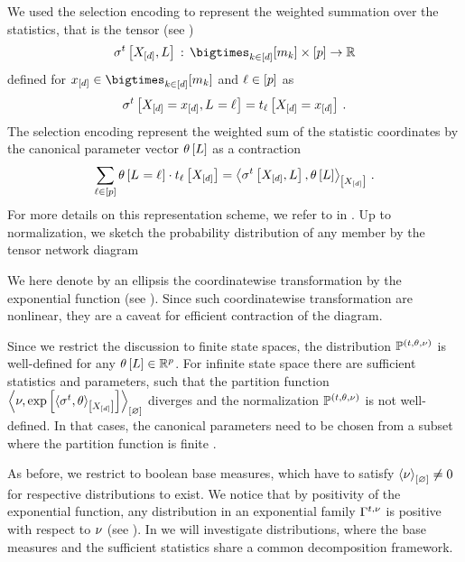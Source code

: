 

We used the selection encoding to represent the weighted summation over the statistics, that is the tensor (see )
\begin{align*}
    \sencsstatat{\shortcatvariables,\selvariable} \defcols \facstates \times [\seldim] \rightarrow \rr
\end{align*}
defined for $\shortcatindices\in\facstates$ and $\ell\in[p]$ as
\begin{align*}
    \sigma^{t}\left[X_{[d]}=x_{[d]},L_{}=\ell_{}\right] = t_{\ell}\left[X_{[d]}=x_{[d]}\right] \, .
\end{align*}
The selection encoding represent the weighted sum of the statistic coordinates by the canonical parameter vector $\theta\left[L\right]$ as a contraction
\begin{align*}
    \sum_{\ell\in[p]}\theta\left[L_{}=\ell_{}\right]\cdot t_{\ell}\left[X_{[d]}\right]
    = \left\langle \sigma^{t}\left[X_{[d]},L\right],\theta\left[L\right]\right\rangle_{\left[ X_{[d]} \right]} \, .
\end{align*}
For more details on this representation scheme, we refer to  in .
Up to normalization, we sketch the probability distribution of any member by the tensor network diagram
\begin{center}
     
\end{center}
We here denote by an ellipsis the coordinatewise transformation by the exponential function (see ).
Since such coordinatewise transformation are nonlinear, they are a caveat for efficient contraction of the diagram.

Since we restrict the discussion to finite state spaces, the distribution $\mathbb{P}^{(t,\theta,\nu)}$ is well-defined for any $\theta\left[L\right]\in\mathbb{R}^{p}$.
For infinite state space there are sufficient statistics and parameters, such that the partition function $\left\langle \nu,\mathrm{exp}\left[\left\langle \sigma^{t},\theta\right\rangle_{\left[ X_{[d]} \right]}\right]\right\rangle_{\left[ \varnothing \right]}$ diverges and the normalization $\mathbb{P}^{(t,\theta,\nu)}$ is not well-defined.
In that cases, the canonical parameters need to be chosen from a subset where the partition function is finite \cite{wainwright_graphical_2008}.

As before, we restrict to boolean base measures, which have to satisfy $\left\langle \nu\right\rangle_{\left[ \varnothing \right]}\neq0$ for respective distributions to exist.
We notice that by positivity of the exponential function, any distribution in an exponential family $\Gamma^{t,\nu}$ is positive with respect to $\nu$ (see ).
In  we will investigate distributions, where the base measures and the sufficient statistics share a common decomposition framework.

